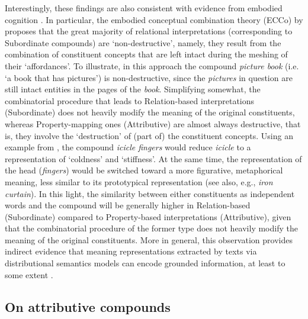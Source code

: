 \documentclass[output=paper]{langsci/langscibook}
\begin{document}
Interestingly, these findings are also consistent with evidence from embodied cognition \citep{louwerse2008}. In particular, the embodied conceptual combination theory ({ECC}o) by \cite{lynott2009} proposes that the great majority of relational interpretations (corresponding to Subordinate compounds) are `non-destructive', namely, they result from the combination of constituent concepts that are left intact during the meshing of their `affordances'. To illustrate, in this approach the compound \emph{picture book} (i.e. `a book that has pictures’) is non-destructive, since the \emph{pictures} in question are still intact entities in the pages of the \emph{book}. Simplifying somewhat, the combinatorial procedure that leads to Relation-based interpretations (Subordinate) does not heavily modify the meaning of the original constituents, whereas Property-mapping ones (Attributive) are almost always destructive, that is, they involve the `destruction' of (part of) the constituent concepts. Using an example from \cite{lynott2009}, the compound \emph{icicle fingers} would reduce \emph{icicle} to a representation of `coldness' and `stiffness'. At the same time, the representation of the head (\emph{fingers}) would be switched toward a more figurative, metaphorical meaning, less similar to its prototypical representation (see also, e.g., \emph{iron curtain}). In this light, the similarity between either constituents as independent words and the compound will be generally higher in Relation-based (Subordinate) compared to Property-based interpretations (Attributive), given that the combinatorial procedure of the former type does not heavily modify the meaning of the original constituents. More in general, this observation provides indirect evidence that meaning representations extracted by texts via distributional semantics models can encode grounded information, at least to some extent \citep{louwerse2011}.

\subsection{On attributive compounds}
\end{document}
